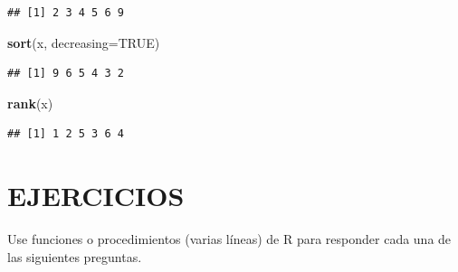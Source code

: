 \documentclass[10pt,]{krantz}
\makeatletter
\newenvironment{Shaded}{\begin{snugshade}}{\end{snugshade}}
\newcommand{\KeywordTok}[1]{\textcolor[rgb]{0.13,0.29,0.53}{\textbf{#1}}}
\newcommand{\DataTypeTok}[1]{\textcolor[rgb]{0.13,0.29,0.53}{#1}}
\newcommand{\OtherTok}[1]{\textcolor[rgb]{0.56,0.35,0.01}{#1}}
\newcommand{\NormalTok}[1]{#1}
\let\proglang=\textsf
\newenvironment{kframe}{%
\medskip{}
\setlength{\fboxsep}{.8em}
 \def\at@end@of@kframe{}%
 \ifinner\ifhmode%
  \def\at@end@of@kframe{\end{minipage}}%
  \begin{minipage}{\columnwidth}%
 \fi\fi%
 \def\FrameCommand##1{\hskip\@totalleftmargin \hskip-\fboxsep
 \colorbox{shadecolor}{##1}\hskip-\fboxsep
     \hskip-\linewidth \hskip-\@totalleftmargin \hskip\columnwidth}%
 \MakeFramed {\advance\hsize-\width
   \@totalleftmargin\z@ \linewidth\hsize
   \@setminipage}}%
 {\par\unskip\endMakeFramed%
 \at@end@of@kframe}
\renewenvironment{Shaded}{\begin{kframe}}{\end{kframe}}
\makeatother
\begin{document}
\begin{verbatim}
## [1] 2 3 4 5 6 9
\end{verbatim}

\begin{Shaded}
\begin{Highlighting}[]
\KeywordTok{sort}\NormalTok{(x, }\DataTypeTok{decreasing=}\OtherTok{TRUE}\NormalTok{)}
\end{Highlighting}
\end{Shaded}

\begin{verbatim}
## [1] 9 6 5 4 3 2
\end{verbatim}

\begin{Shaded}
\begin{Highlighting}[]
\KeywordTok{rank}\NormalTok{(x)}
\end{Highlighting}
\end{Shaded}

\begin{verbatim}
## [1] 1 2 5 3 6 4
\end{verbatim}

\section*{EJERCICIOS}\label{ejercicios-1}


Use funciones o procedimientos (varias líneas) de \proglang{R} para
responder cada una de las siguientes preguntas.
\end{document}
